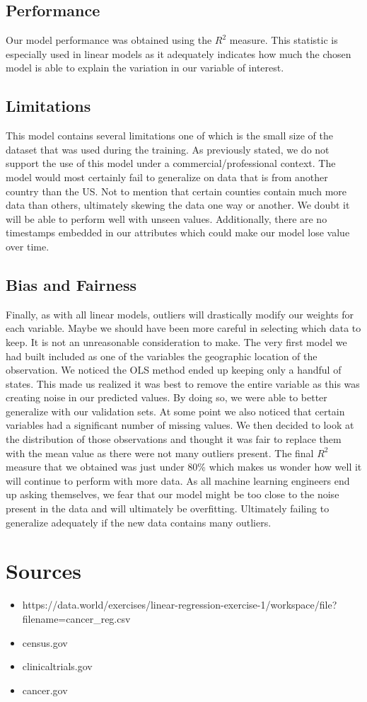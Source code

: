 \documentclass{article}
\begin{document}
\subsection*{Performance}
Our model performance was obtained using the $R^2$ measure. This statistic is especially used in linear models as it adequately indicates how much the chosen model is able to explain the variation in our variable of interest.  
\subsection*{Limitations}
This model contains several limitations one of which is the small size of the dataset that was used during the training. As previously stated, we do not support the use of this model under a commercial/professional context. The model would most certainly fail to generalize on data that is from another country than the US. Not to mention that certain counties contain much more data than others, ultimately skewing the data one way or another. We doubt it will be able to perform well with unseen values. Additionally, there are no timestamps embedded in our attributes which could make our model lose value over time. 
\subsection*{Bias and Fairness}
Finally, as with all linear models, outliers will drastically modify our weights for each variable. Maybe we should have been more careful in selecting which data to keep. It is not an unreasonable consideration to make.
The very first model we had built included as one of the variables the geographic location of the observation. We noticed the OLS method ended up keeping only a handful of states. This made us realized it was best to remove the entire variable as this was creating noise in our predicted values. By doing so, we were able to better generalize with our validation sets. 
At some point we also noticed that certain variables had a significant number of missing values. We then decided to look at the distribution of those observations and thought it was fair to replace them with the mean value as there were not many outliers present. 
The final $R^2$ measure that we obtained was just under 80\% which makes us wonder how well it will continue to perform with more data. As all machine learning engineers end up asking themselves, we fear that our model might be too close to the noise present in the data and will ultimately be overfitting. Ultimately failing to generalize adequately if the new data contains many outliers. 
\section*{Sources}
\begin{itemize}
    \item https://data.world/exercises/linear-regression-exercise-1/workspace/file?filename=cancer\_reg.csv
    \item census.gov
    \item clinicaltrials.gov
    \item cancer.gov
\end{itemize}
\end{document}
